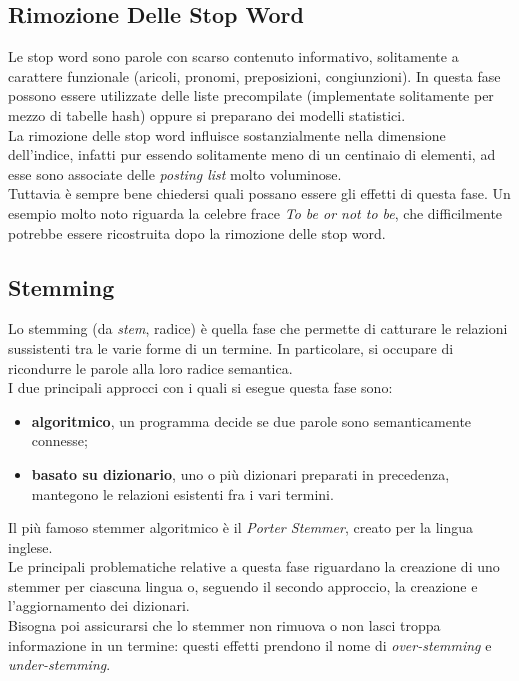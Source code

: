 \documentclass{article}
\begin{document}
\subsection{Rimozione Delle Stop Word}
Le stop word sono parole con scarso contenuto informativo, solitamente a carattere funzionale (aricoli, pronomi, preposizioni, congiunzioni). In questa fase possono essere utilizzate delle liste precompilate (implementate solitamente per mezzo di tabelle hash) oppure si preparano dei modelli statistici.\\
La rimozione delle stop word influisce sostanzialmente nella dimensione dell'indice, infatti pur essendo solitamente meno di un centinaio di elementi, ad esse sono associate delle \textit{posting list} molto voluminose.\\
Tuttavia è sempre bene chiedersi quali possano essere gli effetti di questa fase. Un esempio molto noto riguarda la celebre frace \textit{To be or not to be}, che difficilmente potrebbe essere ricostruita dopo la rimozione delle stop word.

\subsection{Stemming}
Lo stemming (da \textit{stem}, radice) è quella fase che permette di catturare le relazioni sussistenti tra le varie forme di un termine. In particolare, si occupare di ricondurre le parole alla loro radice semantica.\\
I due principali approcci con i quali si esegue questa fase sono:
\begin{itemize}
\item \textbf{algoritmico}, un programma decide se due parole sono semanticamente connesse;
\item \textbf{basato su dizionario}, uno o più dizionari preparati in precedenza, mantegono le relazioni esistenti fra i vari termini.
\end{itemize}
Il più famoso stemmer algoritmico è il \textit{Porter Stemmer}, creato per la lingua inglese.\\
Le principali problematiche relative a questa fase riguardano la creazione di uno stemmer per ciascuna lingua o, seguendo il secondo approccio, la creazione e l'aggiornamento dei dizionari.\\
Bisogna poi assicurarsi che lo stemmer non rimuova o non lasci troppa informazione in un termine: questi effetti prendono il nome di \textit{over-stemming} e \textit{under-stemming}.
\end{document}

